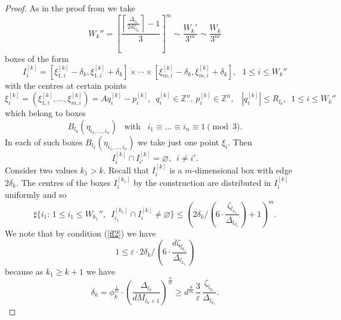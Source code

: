 \documentclass[reqno,11pt, twoside]{amsart}
\theoremstyle{plain}
\theoremstyle{definition}
\theoremstyle{definition}
\theoremstyle{remark}
\numberwithin{equation}{section}
\begin{document}
\begin{proof}
As in the proof from \cite{Mosh-welldistributed}
 we take 
 $$
 W_k'' = \left[ \frac{\left\lceil \frac{\Delta_{l_k}}{2d\zeta_{l_k}}\right\rceil-1}{3}\right]^m \sim \frac{W_{k}'}{3^m} \sim\frac{W_k}{3^m}
 $$
  boxes of the form
 \begin{equation}\label{l}
I_i^{[k]}=  \left[\xi_{1,i}^{[k]}- \delta_k ,\xi_{1,i}^{[k]}+\delta_k \right]\times\cdots\times
 \left[\xi_{m,i}^{[k]}-\delta_k ,\xi_{m,i}^{[k]}+\delta_k \right],\,\,\,\,1\le i \le W_k''
 \end{equation}
 with the  centres at certain points
 $$
 \xi_i^{[k]} = (\xi_{1,i}^{[k]}, ...,\xi_{m,i}^{[k]}) = Aq_i^{[k]}-p_i^{[k]},\,\,\,
 q_i^{[k]}\in \mathbb{Z}^n,
\, p_i^{[k]}\in \mathbb{Z}^n 
  ,\,\,\,\,\,|q_i^{[k]}|\le R_{l_k},\,\,\, 1\le i \le W_k''
  $$
 which belong to boxes 
 \begin{equation}\label{Cq}
 B_{l_k}({\eta}_{i_1,...,i_n})\,\,\,\,\,\text{with} \,\,\,\,\,i_1\equiv ...\equiv i_n \equiv 1 \pmod{3}. 
 \end{equation}
 In each of such boxes $B_{l_k}({\eta}_{i_1,...,i_n})$ we take just one point  ${\xi}_{i} $.
Then
\begin{equation}\label{aint}
I_i^{[k]}\cap I_{i'}^{[k]}=\varnothing,\,\,\,i\neq i'.    
 \end{equation}
 Consider two values  $k_1>k$.
 Recall that $I_i^{[k]}$ is a $m$-dimensional box with edge $ 2\delta_k$.  
 The centres of  the boxes $I_i^{[k_1]}$ 
 by the construction are
 distributed in $I_i^{[k]}$ uniformly and so
 \begin{equation}\label{sharp0}
 \sharp \{ i_1:\, 1\le i_1\le W_{k_1}'',\,\,\,  I_{i_1}^{[k_1]} \cap I^{[k]}_i \neq \varnothing \}  \le
 \left(2\delta_k/
 \left(6\cdot \frac{\zeta_{l_{k_1}}}{\Delta_{l_{k_1}}}\right)+1\right)^m .
 \end{equation}
We note that by condition (\ref{ff2}) we have
\begin{equation}\label{dop}
1\le  \varepsilon \cdot
2\delta_k/
 \left(6\cdot \frac{d\zeta_{l_{k_1}}}{\Delta_{l_{k_1}}}\right)
 \end{equation}
 because as $k_1 \ge k+1$ we have
  $$
  \delta_k  = \phi_k^{\frac{1}{m}} \cdot \left(\frac{\Delta_{l_k}}{dM_{l_k+1}}\right)^{\frac{n}{m}} \ge d^{\frac{d}{m}} \, \frac{3}{\varepsilon}\, 
  \frac{\zeta_{l_{k_1}}}{\Delta_{l_{k_1}}}.
  $$
 
 
 
 
 

\end{proof}
\end{document}
